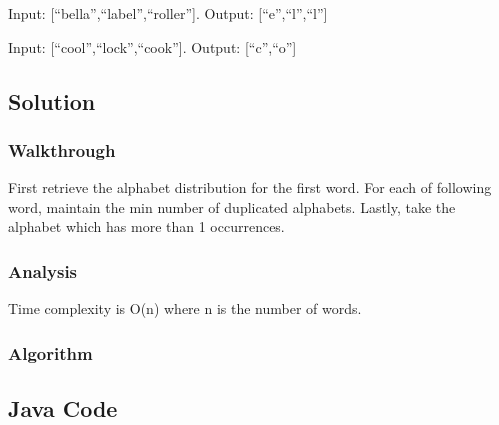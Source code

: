 \documentclass[]{book}
\begin{document}
Input: {[}``bella'',``label'',``roller''{]}. Output: {[}``e'',``l'',``l''{]}

Input: {[}``cool'',``lock'',``cook''{]}. Output: {[}``c'',``o''{]}

\hypertarget{solution-17}{%
\subsection{Solution}\label{solution-17}}

\hypertarget{walkthrough-21}{%
\subsubsection{Walkthrough}\label{walkthrough-21}}

First retrieve the alphabet distribution for the first word. For each of following word, maintain the min number
of duplicated alphabets. Lastly, take the alphabet which has more than 1 occurrences.

\hypertarget{analysis-23}{%
\subsubsection{Analysis}\label{analysis-23}}

Time complexity is O(n) where n is the number of words.

\hypertarget{algorithm-23}{%
\subsubsection{Algorithm}\label{algorithm-23}}

\hypertarget{java-code-19}{%
\subsection{Java Code}\label{java-code-19}}
\end{document}
